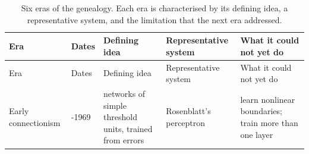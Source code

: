 \documentclass[
  letterpaper,
  11pt]{scrbook}
\begin{document}
\begin{longtable}[]{@{}
  >{\raggedright\arraybackslash}p{}
  >{\raggedright\arraybackslash}p{}
  >{\raggedright\arraybackslash}p{}
  >{\raggedright\arraybackslash}p{}
  >{\raggedright\arraybackslash}p{}@{}}
\caption{Six eras of the genealogy. Each era is characterised by its
defining idea, a representative system, and the limitation that the next
era addressed.}\label{tbl-genesis-eras}\tabularnewline
\toprule\noalign{}
\begin{minipage}[b]{\linewidth}\raggedright
Era
\end{minipage} & \begin{minipage}[b]{\linewidth}\raggedright
Dates
\end{minipage} & \begin{minipage}[b]{\linewidth}\raggedright
Defining idea
\end{minipage} & \begin{minipage}[b]{\linewidth}\raggedright
Representative system
\end{minipage} & \begin{minipage}[b]{\linewidth}\raggedright
What it could not yet do
\end{minipage} \\
\midrule\noalign{}
\endfirsthead
\toprule\noalign{}
\begin{minipage}[b]{\linewidth}\raggedright
Era
\end{minipage} & \begin{minipage}[b]{\linewidth}\raggedright
Dates
\end{minipage} & \begin{minipage}[b]{\linewidth}\raggedright
Defining idea
\end{minipage} & \begin{minipage}[b]{\linewidth}\raggedright
Representative system
\end{minipage} & \begin{minipage}[b]{\linewidth}\raggedright
What it could not yet do
\end{minipage} \\
\midrule\noalign{}
\endhead
\bottomrule\noalign{}
\endlastfoot
Early connectionism & 1943-1969 & networks of simple threshold units,
trained from errors & Rosenblatt's perceptron & learn nonlinear
boundaries; train more than one layer \\

\end{longtable}
\end{document}
